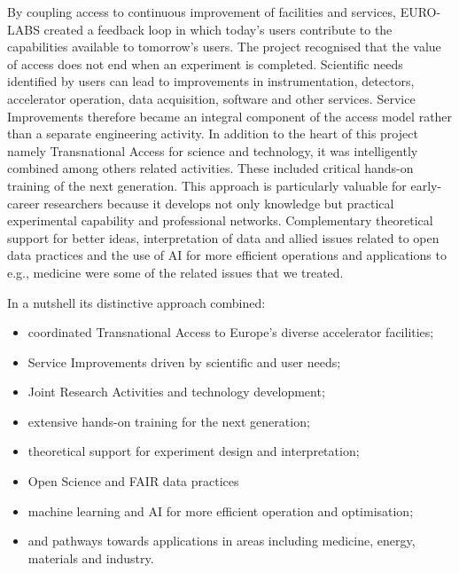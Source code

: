 By coupling access to continuous improvement of facilities and services, EURO-LABS created a feedback loop in which today's users contribute to the capabilities available to tomorrow's users. The project recognised that the value of access does not end when an experiment is completed. Scientific needs identified by users can lead to improvements in instrumentation, detectors, accelerator operation, data acquisition, software and other services. Service Improvements therefore became an integral component of the access model rather than a separate engineering activity. In addition to the heart of this project namely Transnational Access for science and technology, it was intelligently combined among others related activities. These included critical hands-on training of the next  generation. This approach is particularly valuable for early-career researchers because it develops not only knowledge but practical experimental capability and professional networks. Complementary theoretical support for better ideas, interpretation of data and allied issues related to open data practices and the use of AI for more efficient operations and applications to e.g., medicine were some of the related issues that we treated.

In a nutshell its distinctive approach combined:
\begin{itemize}
\item coordinated Transnational Access to Europe's diverse accelerator facilities; 
\item Service Improvements driven by scientific and user needs; 
\item Joint Research Activities and technology development; 
\item extensive hands-on training for the next generation; 
\item theoretical support for experiment design and interpretation; 
\item Open Science and FAIR data practices
\item machine learning and AI for more efficient operation and optimisation; 
\item and pathways towards applications in areas including medicine, energy, materials and industry. 
\end{itemize}

